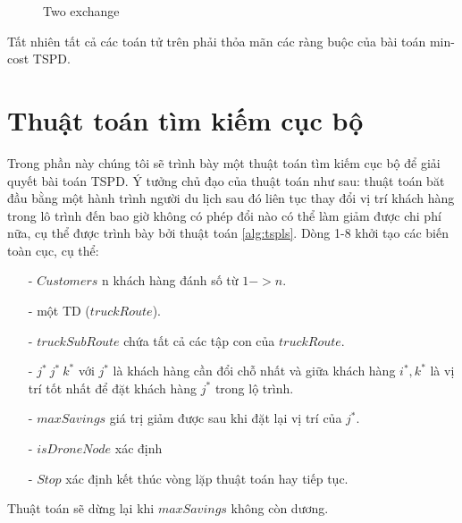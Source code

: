 \documentclass[a4paper,12pt]{report}
\begin{document}
\begin{itemize}
\begin{enumerate}
\begin{figure}[H]
\caption{Two exchange}\label{opeatorTE}
\end{figure}
\end{enumerate}
\end{itemize}
Tất nhiên tất cả các toán tử trên phải thỏa mãn các ràng buộc của bài toán min-cost TSPD.
\section{Thuật toán tìm kiếm cục bộ}
\label{section:tsp-ls}
Trong phần này chúng tôi sẽ trình bày một thuật toán tìm kiếm cục bộ để giải quyết bài toán TSPD. Ý tưởng chủ đạo của thuật toán như sau: thuật toán băt đầu bằng một hành trình người du lịch sau đó liên tục thay đổi vị trí khách hàng trong lô trình đến bao giờ không có phép đổi nào có thể làm giảm được chi phí nữa, cụ thể được trình bày bởi thuật toán \ref{alg:tspls}. Dòng 1-8 khởi tạo các biến toàn cục, cụ thể:
\begin{itemize}
\item[-] $Customers$ n khách hàng đánh số từ $1->n$.
\item[-] một TD ($truckRoute$).
\item[-] $truckSubRoute$ chứa  tất cả các tập con của $truckRoute$.
\item[-] $j^* \ j^* \ k^*$ với $j^*$ là khách hàng cần đổi chỗ nhất và giữa khách hàng $i^* ,k^*$ là vị trí tốt nhất để đặt khách hàng $j^*$ trong lộ trình.
\item[-] $maxSavings$ giá trị giảm được sau khi đặt lại vị trí của $j^*$.
\item[-] $isDroneNode$ xác định 
\item[-] $Stop$ xác định kết thúc vòng lặp thuật toán hay tiếp tục.
\end{itemize}
Thuật toán sẽ dừng lại khi $maxSavings$ không còn dương. \\
\end{document}
